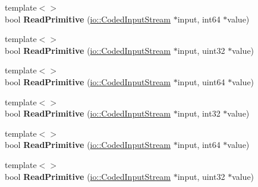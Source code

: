 \begin{DoxyCompactItemize}
{\footnotesize template$<$$>$ }\\bool {\bfseries Read\+Primitive} (\hyperlink{classgoogle_1_1protobuf_1_1io_1_1CodedInputStream}{io\+::\+Coded\+Input\+Stream} $\ast$input, int64 $\ast$value)
\item 
\mbox{\label{classgoogle_1_1protobuf_1_1internal_1_1WireFormatLite_a006d43265daa0972ce9ef688b5bfad64}} 
{\footnotesize template$<$$>$ }\\bool {\bfseries Read\+Primitive} (\hyperlink{classgoogle_1_1protobuf_1_1io_1_1CodedInputStream}{io\+::\+Coded\+Input\+Stream} $\ast$input, uint32 $\ast$value)
\item 
\mbox{\label{classgoogle_1_1protobuf_1_1internal_1_1WireFormatLite_ab8efde617fc6177d352310904dc63fc5}} 
{\footnotesize template$<$$>$ }\\bool {\bfseries Read\+Primitive} (\hyperlink{classgoogle_1_1protobuf_1_1io_1_1CodedInputStream}{io\+::\+Coded\+Input\+Stream} $\ast$input, uint64 $\ast$value)
\item 
\mbox{\label{classgoogle_1_1protobuf_1_1internal_1_1WireFormatLite_ad937cb6f432cd24810e1c9446b2fd328}} 
{\footnotesize template$<$$>$ }\\bool {\bfseries Read\+Primitive} (\hyperlink{classgoogle_1_1protobuf_1_1io_1_1CodedInputStream}{io\+::\+Coded\+Input\+Stream} $\ast$input, int32 $\ast$value)
\item 
\mbox{\label{classgoogle_1_1protobuf_1_1internal_1_1WireFormatLite_a2b403f70285933949254f6150098e4e4}} 
{\footnotesize template$<$$>$ }\\bool {\bfseries Read\+Primitive} (\hyperlink{classgoogle_1_1protobuf_1_1io_1_1CodedInputStream}{io\+::\+Coded\+Input\+Stream} $\ast$input, int64 $\ast$value)
\item 
\mbox{\label{classgoogle_1_1protobuf_1_1internal_1_1WireFormatLite_a006d43265daa0972ce9ef688b5bfad64}} 
{\footnotesize template$<$$>$ }\\bool {\bfseries Read\+Primitive} (\hyperlink{classgoogle_1_1protobuf_1_1io_1_1CodedInputStream}{io\+::\+Coded\+Input\+Stream} $\ast$input, uint32 $\ast$value)

\end{DoxyCompactItemize}
